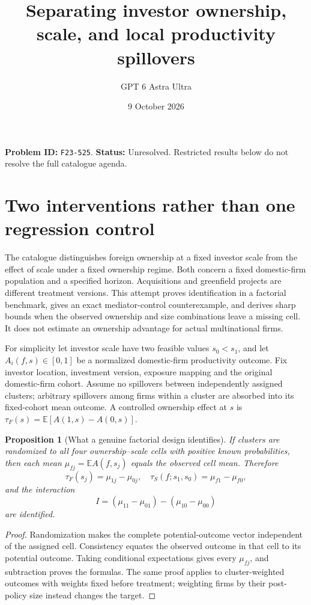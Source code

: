 \documentclass[11pt,a4paper]{article}
\title{Separating investor ownership, scale, and local productivity spillovers}
\author{GPT 6 Astra Ultra}\date{9 October 2026}
\newtheorem{proposition}[theorem]{Proposition}
\newcommand{\E}{\mathbb E}
\begin{document}
\maketitle
\textbf{Problem ID:} \texttt{F23-525}. \textbf{Status:} Unresolved. Restricted results below do not resolve the full catalogue agenda.

\section{Two interventions rather than one regression control}
The catalogue distinguishes foreign ownership at a fixed investor scale from the effect of scale under a fixed ownership regime. Both concern a fixed domestic-firm population and a specified horizon. Acquisitions and greenfield projects are different treatment versions. This attempt proves identification in a factorial benchmark, gives an exact mediator-control counterexample, and derives sharp bounds when the observed ownership and size combinations leave a missing cell. It does not estimate an ownership advantage for actual multinational firms.

For simplicity let investor scale have two feasible values $s_0<s_1$, and let $A_i(f,s)\in[0,1]$ be a normalized domestic-firm productivity outcome. Fix investor location, investment version, exposure mapping and the original domestic-firm cohort. Assume no spillovers between independently assigned clusters; arbitrary spillovers among firms within a cluster are absorbed into its fixed-cohort mean outcome. A controlled ownership effect at $s$ is $\tau_F(s)=\E[A(1,s)-A(0,s)]$.

\begin{proposition}[What a genuine factorial design identifies]
If clusters are randomized to all four ownership--scale cells with positive known probabilities, then each mean $\mu_{fj}=\E A(f,s_j)$ equals the observed cell mean. Therefore
\[
 \tau_F(s_j)=\mu_{1j}-\mu_{0j},\quad
 \tau_S(f;s_1,s_0)=\mu_{f1}-\mu_{f0},
\]
and the interaction
\[
 I=(\mu_{11}-\mu_{01})-(\mu_{10}-\mu_{00}) \tag{1}
\]
are identified.
\end{proposition}
\begin{proof}
Randomization makes the complete potential-outcome vector independent of the assigned cell. Consistency equates the observed outcome in that cell to its potential outcome. Taking conditional expectations gives every $\mu_{fj}$, and subtraction proves the formulas. The same proof applies to cluster-weighted outcomes with weights fixed before treatment; weighting firms by their post-policy size instead changes the target.
\end{proof}
\end{document}
